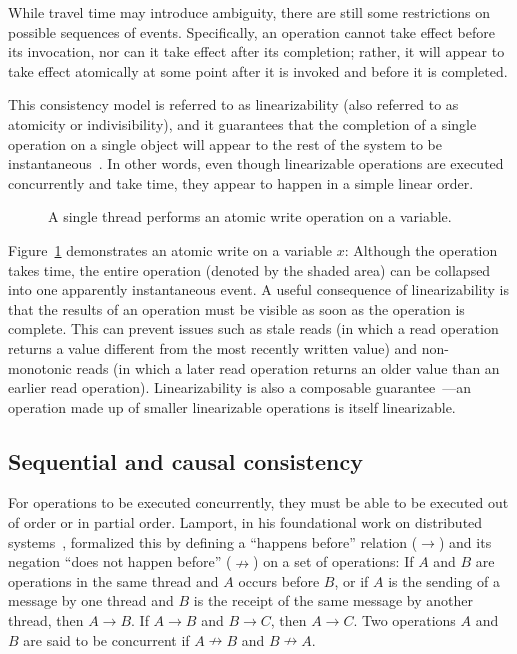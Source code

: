 \documentclass{sig-alternate}
\begin{document}
While travel time may introduce ambiguity, there are still some restrictions on possible sequences of events. Specifically, an operation cannot take effect before its invocation, nor can it take effect after its completion; rather, it will appear to take effect atomically at some point after it is invoked and before it is completed.

This consistency model is referred to as linearizability (also referred to as atomicity or indivisibility), and it guarantees that the completion of a single operation on a single object will appear to the rest of the system to be instantaneous~\cite{Herlihy1990}. In other words, even though linearizable operations are executed concurrently and take time, they appear to happen in a simple linear order.

\begin{figure}[ht]
  \centering
  \resizebox{0.76\linewidth}{!}{}
  \caption{A single thread performs an atomic write operation on a variable.}
\label{figure:linearizability}
\end{figure}

Figure~\ref{figure:linearizability} demonstrates an atomic write on a variable $x$: Although the operation takes time, the entire operation (denoted by the shaded area) can be collapsed into one apparently instantaneous event. A useful consequence of linearizability is that the results of an operation must be visible as soon as the operation is complete. This can prevent issues such as stale reads (in which a read operation returns a value different from the most recently written value) and non-monotonic reads (in which a later read operation returns an older value than an earlier read operation). Linearizability is also a composable guarantee~\cite{Herlihy1990}---an operation made up of smaller linearizable operations is itself linearizable.

\subsection{Sequential and causal consistency}

For operations to be executed concurrently, they must be able to be executed out of order or in partial order. Lamport, in his foundational work on distributed systems~\cite{Lamport1978}, formalized this by defining a ``happens before'' relation ($\rightarrow$) and its negation ``does not happen before'' ($\nrightarrow$) on a set of operations: If $A$ and $B$ are operations in the same thread and $A$ occurs before $B$, or if $A$ is the sending of a message by one thread and $B$ is the receipt of the same message by another thread, then $A \rightarrow B$. If $A \rightarrow B$ and $B \rightarrow C$, then $A \rightarrow C$. Two operations $A$ and $B$ are said to be concurrent if $A \nrightarrow B$ and $B \nrightarrow A$.
\end{document}
